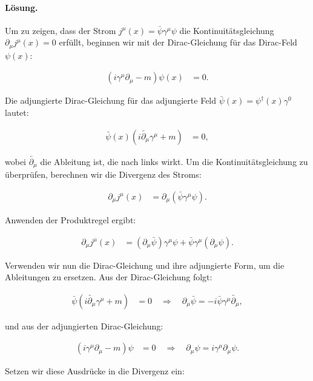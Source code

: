 \documentclass[11pt,a4paper]{article}
\begin{document}
\paragraph{Lösung.}
Um zu zeigen, dass der Strom $j^\mu(x) = \bar{\psi} \gamma^\mu \psi$ die Kontinuitätsgleichung $\partial_\mu j^\mu(x) = 0$ erfüllt, beginnen wir mit der Dirac-Gleichung für das Dirac-Feld $\psi(x)$:

\begin{align*}
(i \gamma^\mu \partial_\mu - m) \psi(x) &= 0.
\end{align*}

Die adjungierte Dirac-Gleichung für das adjungierte Feld $\bar{\psi}(x) = \psi^\dagger(x) \gamma^0$ lautet:

\begin{align*}
\bar{\psi}(x) (i \overleftarrow{\partial_\mu} \gamma^\mu + m) &= 0,
\end{align*}

wobei $\overleftarrow{\partial_\mu}$ die Ableitung ist, die nach links wirkt. Um die Kontinuitätsgleichung zu überprüfen, berechnen wir die Divergenz des Stroms:

\begin{align*}
\partial_\mu j^\mu(x) &= \partial_\mu (\bar{\psi} \gamma^\mu \psi).
\end{align*}

Anwenden der Produktregel ergibt:

\begin{align*}
\partial_\mu j^\mu(x) &= (\partial_\mu \bar{\psi}) \gamma^\mu \psi + \bar{\psi} \gamma^\mu (\partial_\mu \psi).
\end{align*}

Verwenden wir nun die Dirac-Gleichung und ihre adjungierte Form, um die Ableitungen zu ersetzen. Aus der Dirac-Gleichung folgt:

\begin{align*}
\bar{\psi} (i \overleftarrow{\partial_\mu} \gamma^\mu + m) &= 0 \quad \Rightarrow \quad \partial_\mu \bar{\psi} = -i \bar{\psi} \gamma^\mu \overleftarrow{\partial_\mu},
\end{align*}

und aus der adjungierten Dirac-Gleichung:

\begin{align*}
(i \gamma^\mu \partial_\mu - m) \psi &= 0 \quad \Rightarrow \quad \partial_\mu \psi = i \gamma^\mu \partial_\mu \psi.
\end{align*}

Setzen wir diese Ausdrücke in die Divergenz ein:
\end{document}
